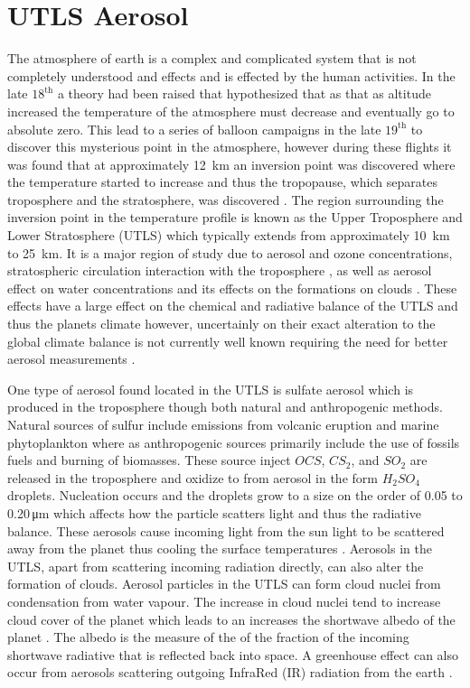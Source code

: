 \section{UTLS Aerosol}

The atmosphere of earth is a complex and complicated system that is not completely understood and effects and is effected by the human activities. In the late $18^{\text{th}}$ a theory had been raised that hypothesized that as that as altitude increased the temperature of the atmosphere must decrease and eventually go to absolute zero. This lead to a series of balloon campaigns in the late $19^{\text{th}}$ to discover this mysterious point in the atmosphere, however during these flights it was found that at approximately 12~km an inversion point was discovered where the temperature started to increase and thus the tropopause, which separates troposphere and the stratosphere, was discovered \citep{Hoinka1997}. The region surrounding the inversion point in the temperature profile is known as the Upper Troposphere and Lower Stratosphere (UTLS) which typically extends from approximately 10~km to 25~km. It is a major region of study due to aerosol and ozone concentrations, stratospheric circulation interaction with the troposphere \citep{Baldwin2007}, as well as aerosol effect on water concentrations and its effects on the formations on clouds \citep{Demott1997}. These effects have a large effect on the chemical and radiative balance of the UTLS and thus the planets climate \citep{McCormick1995,Solomon1999} however, uncertainly on their exact alteration to the global climate balance is not currently well known requiring the need for better aerosol measurements \citep{Solomon2007}.

One type of aerosol found located in the UTLS is sulfate aerosol which is produced in the troposphere though both natural and anthropogenic methods. Natural sources of sulfur include emissions from volcanic eruption and marine phytoplankton \citep{Bates1992} where as anthropogenic sources primarily include the use of fossils fuels and burning of biomasses. These source inject $OCS$, $CS_{2}$, and $SO_{2}$ are released in the troposphere and oxidize to from aerosol in the form $H_{2}SO_{4}$ droplets. Nucleation occurs and the droplets grow to a size on the order of 0.05 to 0.20\,\si{\micro\metre} \citep{Brock1995} which affects how the particle scatters light and thus the radiative balance. These aerosols cause incoming light from the sun light to be scattered away from the planet thus cooling the surface temperatures \citep{Dutton1992,Pollack1976}. Aerosols in the UTLS, apart from scattering incoming radiation directly, can also alter the formation of clouds. Aerosol particles in the UTLS can form cloud nuclei from condensation from water vapour. The increase in cloud nuclei tend to increase cloud cover of the planet which leads to an increases the shortwave albedo of the planet \citep{Charlson1992}. The albedo is the measure of the of the fraction of the incoming shortwave radiative that is reflected back into space. A greenhouse effect can also occur from aerosols scattering outgoing InfraRed (IR) radiation from the earth \citep{Kiehl1993}.

